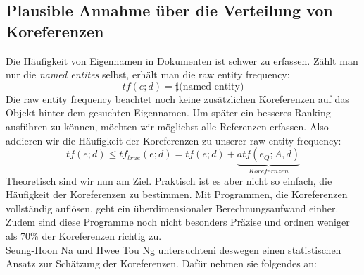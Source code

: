 \subsection{Plausible Annahme über die Verteilung von Koreferenzen}
Die Häufigkeit von Eigennamen in Dokumenten ist schwer zu erfassen. Zählt man nur die \textit{named entites} selbst, erhält man die raw entity frequency:
\[tf\left( e;d \right)=\sharp \text{(named entity)}\]
Die raw entity frequency beachtet  noch keine zusätzlichen Koreferenzen auf das Objekt hinter dem gesuchten Eigennamen. Um später ein besseres Ranking ausführen zu können, möchten wir möglichst alle Referenzen erfassen. Also addieren wir die Häufigkeit der Koreferenzen zu unserer raw entity frequency:
\[tf\left( e;d \right)\leq tf_{true}\left( e;d \right)=tf\left( e;d \right)+\underbrace{atf(e_Q;A,d)}_{Korefernzen}\]
Theoretisch sind wir nun am Ziel. Praktisch ist es aber nicht so einfach, die Häufigkeit der Koreferenzen zu bestimmen. Mit Programmen, die Koreferenzen vollständig auflösen, geht ein überdimensionaler Berechnungsaufwand einher. Zudem sind diese Programme noch nicht besonders Präzise und ordnen weniger als 70\% der Koreferenzen richtig zu.\cite{paper:Na}
\\
Seung-Hoon Na und Hwee Tou Ng untersuchteni deswegen einen statistischen Ansatz zur Schätzung der Koreferenzen. Dafür nehmen sie folgendes an:
\\
